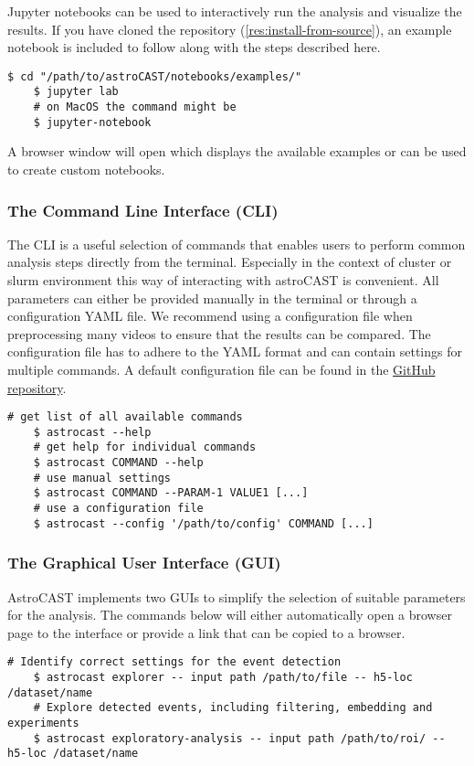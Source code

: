 Jupyter notebooks can be used to interactively run the analysis and visualize the results.
If you have cloned the repository (\ref{res:install-from-source}), an example notebook is included to follow along with the steps described here.

\begin{lstlisting}[style=bashStyle]
    $ cd "/path/to/astroCAST/notebooks/examples/"
    $ jupyter lab
    # on MacOS the command might be
    $ jupyter-notebook
\end{lstlisting}

A browser window will open which displays the available examples or can be used to create custom notebooks.

\subsubsection{The Command Line Interface (CLI)}

The \ac{CLI} is a useful selection of commands that enables users to perform common analysis steps directly from the terminal. Especially in the context of cluster or slurm environment this way of interacting with astroCAST is convenient. All parameters can either be provided manually in the terminal or through a configuration YAML file. We recommend using a configuration file when preprocessing many videos to ensure that the results can be compared. The configuration file has to adhere to the YAML format and can contain settings for multiple commands. A default configuration file can be found in the \href{https://github.com/janreising/astroCAST/blob/3ad41d03068732419df7fdde9b2a0f449898d4e2/config.yaml}{GitHub repository}.

\begin{lstlisting}[style=bashStyle]
    # get list of all available commands
    $ astrocast --help
    # get help for individual commands
    $ astrocast COMMAND --help
    # use manual settings
    $ astrocast COMMAND --PARAM-1 VALUE1 [...]
    # use a configuration file
    $ astrocast --config '/path/to/config' COMMAND [...]
\end{lstlisting}

\subsubsection{The Graphical User Interface (GUI)}

AstroCAST implements two \ac{GUI}s to simplify the selection of suitable parameters for the analysis. The commands below will either automatically open a browser page to the interface or provide a link that can be copied to a browser.

\begin{lstlisting}[style=bashStyle]
    # Identify correct settings for the event detection
    $ astrocast explorer -- input path /path/to/file -- h5-loc /dataset/name
    # Explore detected events, including filtering, embedding and experiments
    $ astrocast exploratory-analysis -- input path /path/to/roi/ -- h5-loc /dataset/name
\end{lstlisting}
